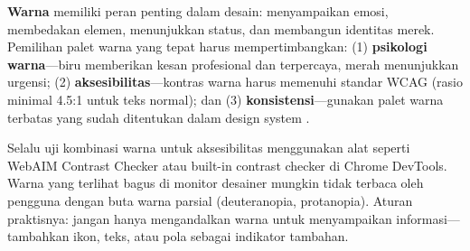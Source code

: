 \textbf{Warna} memiliki peran penting dalam desain: menyampaikan emosi, membedakan elemen, menunjukkan status, dan membangun identitas merek. Pemilihan palet warna yang tepat harus mempertimbangkan: (1) \textbf{psikologi warna}---biru memberikan kesan profesional dan terpercaya, merah menunjukkan urgensi; (2) \textbf{aksesibilitas}---kontras warna harus memenuhi standar WCAG (rasio minimal 4.5:1 untuk teks normal); dan (3) \textbf{konsistensi}---gunakan palet warna terbatas yang sudah ditentukan dalam design system \cite{webdevAccessibility}.


\begin{catatan}
Selalu uji kombinasi warna untuk aksesibilitas menggunakan alat seperti WebAIM Contrast Checker atau built-in contrast checker di Chrome DevTools. Warna yang terlihat bagus di monitor desainer mungkin tidak terbaca oleh pengguna dengan buta warna parsial (deuteranopia, protanopia). Aturan praktisnya: jangan hanya mengandalkan warna untuk menyampaikan informasi---tambahkan ikon, teks, atau pola sebagai indikator tambahan.
\end{catatan}
